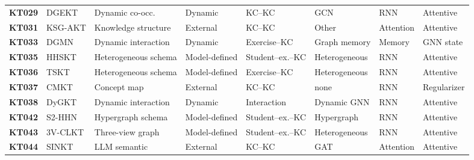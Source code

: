 \documentclass[lettersize,journal]{IEEEtran}
\begin{document}
\begin{table}[t]
\begin{tabular}{@{}ll>{\raggedright\arraybackslash}p{2.15cm}l>{\raggedright\arraybackslash}p{1.55cm}lll@{}}
\textbf{KT029} & DGEKT \cite{KT029_DGEKT_2024} & Dynamic co-occ. & Dynamic & KC--KC & GCN & RNN & Attentive \\
\textbf{KT031} & KSG-AKT \cite{KT031_KSGAKT_2022} & Knowledge structure & External & KC--KC & Other & Attention & Attentive \\
\textbf{KT033} & DGMN \cite{KT033_DGMN_2023} & Dynamic interaction & Dynamic & Exercise--KC & Graph memory & Memory & GNN state \\
\textbf{KT035} & HHSKT \cite{KT035_HHSKT_2023} & Heterogeneous schema & Model-defined & Student--ex.--KC & Heterogeneous & RNN & Attentive \\
\textbf{KT036} & TSKT \cite{KT036_TSKT_2024} & Heterogeneous schema & Model-defined & Exercise--KC & Heterogeneous & RNN & Attentive \\
\textbf{KT037} & CMKT \cite{KT037_CMKT_2022} & Concept map & External & KC--KC & none & RNN & Regularizer \\
\textbf{KT038} & DyGKT \cite{KT038_DyGKT_2024} & Dynamic interaction & Dynamic & Interaction & Dynamic GNN & RNN & Attentive \\
\textbf{KT042} & S2-HHN \cite{KT042_S2HHN_2023} & Hypergraph schema & Model-defined & Student--ex.--KC & Hypergraph & RNN & Attentive \\
\textbf{KT043} & 3V-CLKT \cite{KT043_3VCLKT_2024} & Three-view graph & Model-defined & Student--ex.--KC & Heterogeneous & RNN & Attentive \\
\textbf{KT044} & SINKT \cite{KT044_SINKT_2024} & LLM semantic & External & KC--KC & GAT & Attention & Attentive \\
\bottomrule
\end{tabular}
\end{table}
\end{document}
